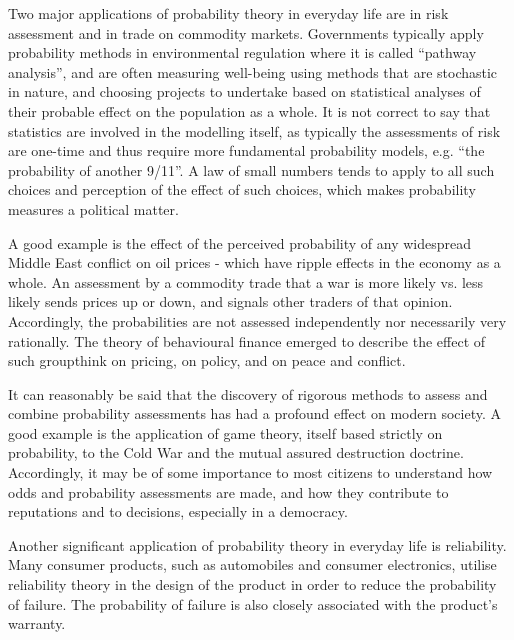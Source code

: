 {
Two major applications of probability theory in everyday life are in risk assessment and in trade on commodity markets. Governments typically apply probability methods in environmental regulation where it is called ``pathway analysis'', and are often measuring well-being using methods that are stochastic in nature, and choosing projects to undertake based on statistical analyses of their probable effect on the population as a whole. It is not correct to say that statistics are involved in the modelling itself, as typically the assessments of risk are one-time and thus require more fundamental probability models, e.g. ``the probability of another 9/11''. A law of small numbers tends to apply to all such choices and perception of the effect of such choices, which makes probability measures a political matter.

A good example is the effect of the perceived probability of any widespread Middle East conflict on oil prices - which have ripple effects in the economy as a whole. An assessment by a commodity trade that a war is more likely vs. less likely sends prices up or down, and signals other traders of that opinion. Accordingly, the probabilities are not assessed independently nor necessarily very rationally. The theory of behavioural finance emerged to describe the effect of such groupthink on pricing, on policy, and on peace and conflict.

It can reasonably be said that the discovery of rigorous methods to assess and combine probability assessments has had a profound effect on modern society. A good example is the application of game theory, itself based strictly on probability, to the Cold War and the mutual assured destruction doctrine. Accordingly, it may be of some importance to most citizens to understand how odds and probability assessments are made, and how they contribute to reputations and to decisions, especially in a democracy.

Another significant application of probability theory in everyday life is reliability. Many consumer products, such as automobiles and consumer electronics, utilise reliability theory in the design of the product in order to reduce the probability of failure. The probability of failure is also closely associated with the product's warranty.
}

